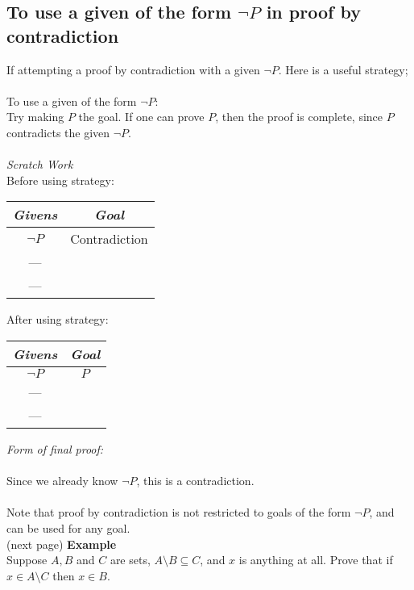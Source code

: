 \documentclass{report}
\theoremstyle{definition}
\begin{document}
\subsection{To use a given of the form $\neg P$ in proof by contradiction}
If attempting a proof by contradiction with a given $\neg P$. Here is a useful strategy;\\
\vspace{1mm}\\
\indent To use a given of the form $\neg P$:\\
\indent Try making $P$ the goal. If one can prove $P$, then the proof is complete, since $P$ contradicts the given $\neg P$.\\
\vspace{1mm}\\
\textit{Scratch Work}\\
Before using strategy:
\begin{center}
\begin{tabular}{c|c}
\textit{Givens}&\textit{Goal}\\
\hline
$\neg P$&Contradiction\\
---&\\
---&
\end{tabular}
\end{center}
After using strategy:
\begin{center}
\begin{tabular}{c|c}
\textit{Givens}&\textit{Goal}\\
\hline
$\neg P$&$P$\\
---&\\
---&
\end{tabular}
\end{center}
\textit{Form of final proof:}\\
\indent{}\\
\indent Since we already know $\neg P$, this is a contradiction.\\
\vspace{1mm}\\
Note that proof by contradiction is not restricted to goals of the form $\neg P$, and can be used for any goal.\\
(next page)\newpage
\noindent\textbf{Example}\\
Suppose $A,B$ and $C$ are sets, $A\setminus B\subseteq C$, and $x$ is anything at all. Prove that if $x\in A\setminus C$ then $x\in B$.\\
\vspace{1mm}\\
\end{document}
